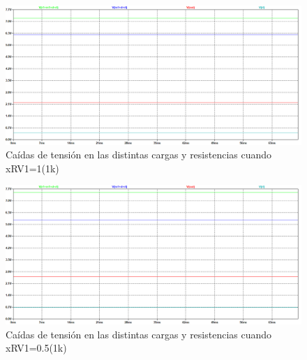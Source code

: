 \begin{enumerate}
\begin{enumerate}
\begin{itemize}
                            \begin{figure}[H]
                                \centering
                                \renewcommand{\figurename}{Gráfica}
                                \includegraphics[width=15cm]{Imagenes/sim_fuente_corriente_variable_x1.png}
                                \caption{Caídas de tensión en las distintas cargas y resistencias cuando xRV1=1(1k)}
                                \label{fig:sim_fuente_corriente_variable_x1}
                            \end{figure}

                            \begin{figure}[H]
                                \centering
                                \renewcommand{\figurename}{Gráfica}
                                \includegraphics[width=15cm]{Imagenes/sim_fuente_corriente_variable_x05.png}
                                \caption{Caídas de tensión en las distintas cargas y resistencias cuando xRV1=0.5(1k)}
                                \label{fig:sim_fuente_corriente_variable_x05}
                            \end{figure}


\end{itemize}
\end{enumerate}
\end{enumerate}
